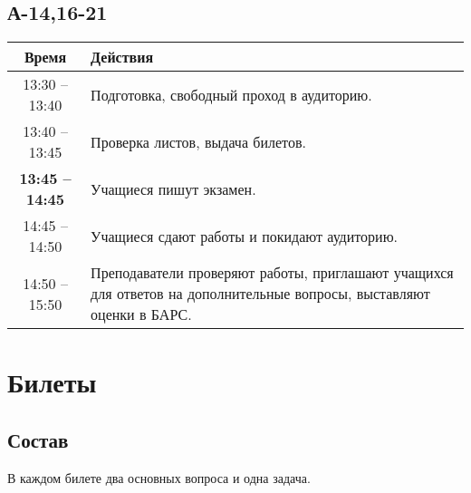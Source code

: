 \documentclass[a4paper,12pt]{article}
\begin{document}
\subsection{А-14,16-21}

\begin{center}
    \begin{tabular}{|c|p{10cm}|}
        \hline
        Время                   & Действия                                                                                                             \\
        \hline
        13:30 -- 13:40          & Подготовка, свободный проход в аудиторию.                                                                            \\
        \hline
        13:40 -- 13:45          & Проверка листов, выдача билетов.                                                                                     \\
        \hline
        \textbf{13:45 -- 14:45} & Учащиеся пишут экзамен.                                                                                              \\
        \hline
        14:45 -- 14:50          & Учащиеся сдают работы и покидают аудиторию.                                                                          \\
        \hline
        14:50 -- 15:50          & Преподаватели проверяют работы, приглашают учащихся для ответов на дополнительные вопросы, выставляют оценки в БАРС. \\
        \hline
    \end{tabular}
\end{center}

\section{Билеты}

\subsection{Состав}

В каждом билете два основных вопроса и одна задача.
\end{document}
